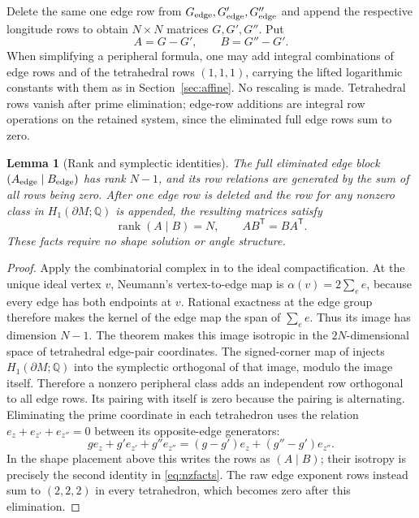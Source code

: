 \documentclass[11pt]{article}
\newtheorem{lemma}[theorem]{Lemma}
\theoremstyle{definition}\newtheorem{definition}[theorem]{Definition}
\theoremstyle{remark}\newtheorem{remark}[theorem]{Remark}
\DeclareMathOperator{\rank}{rank}
\newcommand{\Q}{\mathbb Q}
\begin{document}
Delete the same one edge row from $G_{\rm edge},G'_{\rm edge},
G''_{\rm edge}$ and append the respective longitude rows to obtain
$N\times N$ matrices $G,G',G''$. Put
\begin{equation}A=G-G',\qquad B=G''-G'.\label{eq:nz}\end{equation}
When simplifying a peripheral formula, one may add integral combinations
of edge rows and of the tetrahedral rows $(1,1,1)$, carrying the lifted
logarithmic constants with them as in Section~\ref{sec:affine}.
No rescaling is made. Tetrahedral rows vanish after prime elimination;
edge-row additions are integral row operations on the retained system,
since the eliminated full edge rows sum to zero.
\begin{lemma}[Rank and symplectic identities]\label{lem:nzfacts}
The full eliminated edge block $(A_{\rm edge}\mid B_{\rm edge})$
has rank $N-1$, and its row relations are generated by the sum of all
rows being zero.
After one edge row is deleted and the row for any nonzero class in
$H_1(\partial M;\Q)$ is appended, the resulting matrices satisfy
\begin{equation}
\rank(A\mid B)=N,\qquad AB^{\mathsf T}=BA^{\mathsf T}.
\label{eq:nzfacts}
\end{equation}
These facts require no shape solution or angle structure.
\end{lemma}
\begin{proof}
Apply the combinatorial complex in \cite[Theorem~4.1]{Neumann} to the
ideal compactification. At the unique ideal vertex $v$, Neumann's
vertex-to-edge map is $\alpha(v)=2\sum_e e$, because every edge has
both endpoints at $v$. Rational exactness at the edge group therefore
makes the kernel of the edge map the span of $\sum_e e$. Thus its image has
dimension $N-1$. The theorem makes this image isotropic in the
$2N$-dimensional space of tetrahedral edge-pair coordinates. The
signed-corner map of \cite[Lemma~4.3]{Neumann} injects
$H_1(\partial M;\Q)$ into the symplectic orthogonal of that image,
modulo the image itself. Therefore a nonzero peripheral class adds an
independent row orthogonal to all edge rows. Its pairing with itself is
zero because the pairing is alternating. Eliminating the prime
coordinate in each tetrahedron uses the relation
$e_z+e_{z'}+e_{z''}=0$ between its opposite-edge generators:
\[
g e_z+g'e_{z'}+g''e_{z''}
=(g-g')e_z+(g''-g')e_{z''}.
\]
In the shape placement above this writes the rows as $(A\mid B)$;
their isotropy is precisely the second identity in \eqref{eq:nzfacts}.
The raw edge exponent rows instead sum to $(2,2,2)$ in every
tetrahedron, which becomes zero after this elimination.
\end{proof}
\end{document}
